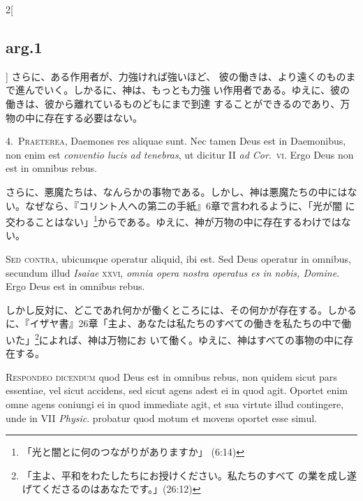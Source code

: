 \documentclass[paper=a4paper,fontsize=10pt,jafontsize=9pt,titlepage]{jlreq}
\begin{document}
\begin{paracol}{2}[\subsection{arg.1}]
さらに、ある作用者が、力強ければ強いほど、
 彼の働きは、より遠くのものまで進んでいく。しかるに、神は、もっとも力強
 い作用者である。ゆえに、彼の働きは、彼から離れているものどもにまで到達
 することができるのであり、万物の中に存在する必要はない。


4.~{\scshape Praeterea}, Daemones res aliquae sunt. Nec tamen Deus est in
 Daemonibus, non enim est {\itshape conventio lucis ad tenebras}, ut dicitur II {\itshape ad Cor}.~{\scshape vi}. Ergo Deus non est in omnibus rebus.

\switchcolumn

さらに、悪魔たちは、なんらかの事物である。しかし、神は悪魔たちの中にはな
 い。なぜなら、『コリント人への第二の手紙』6章で言われるように、「光が闇
 に交わることはない」\footnote{「光と闇とに何のつながりがありますか」
 (6:14)}からである。ゆえに、神が万物の中に存在するわけではない。

\switchcolumn*[\subsection{s.c.}]

{\scshape Sed contra}, ubicumque operatur aliquid, ibi est. Sed Deus
 operatur in omnibus, secundum illud {\itshape Isaiae} {\scshape xxvi},
 {\itshape omnia opera nostra operatus es in nobis, Domine}. Ergo Deus
 est in omnibus rebus.

\switchcolumn

しかし反対に、どこであれ何かが働くところには、その何かが存在する。しかる
 に、『イザヤ書』26章「主よ、あなたは私たちのすべての働きを私たちの中で働
 いた」\footnote{「主よ、平和をわたしたちにお授けください。私たちのすべて
 の業を成し遂げてくださるのはあなたです。」(26:12)}によれば、神は万物にお
 いて働く。ゆえに、神はすべての事物の中に存在する。


{\scshape Respondeo dicendum} quod Deus est in omnibus rebus, non quidem sicut pars
 essentiae, vel sicut accidens, sed sicut agens adest ei in quod
 agit. Oportet enim omne agens coniungi ei in quod immediate agit, et
 sua virtute illud contingere, unde in VII {\itshape Physic}. probatur quod motum
 et movens oportet esse simul.


\end{paracol}
\end{document}
